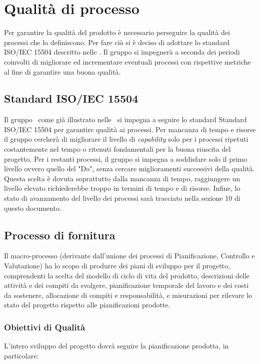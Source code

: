 \newpage

\section{Qualità di processo}
Per garantire la qualità del prodotto è necessario perseguire la qualità dei processi che lo definiscono. Per fare ciò si è deciso di adottare lo standard ISO/IEC 15504 descritto nelle \NdP. Il gruppo \gruppo{} si impegnerà a seconda dei periodi coinvolti di migliorare ed incrementare eventuali processi con rispettive metriche al fine di garantire una buona qualità.

\subsection{Standard ISO/IEC 15504}
Il gruppo \gruppo\ come già illustrato nelle \NdP\ si impegna a seguire lo standard Standard ISO/IEC 15504 per garantire qualità ai processi. Per mancanza di tempo e risorse il gruppo cercherà di migliorare il livello di \textit{capability} solo per i processi ripetuti costantemente nel tempo o ritenuti fondamentali per la buona riuscita del progetto. Per i restanti processi, il gruppo si impegna a soddisfare solo il primo livello ovvero quello del "Do", senza cercare miglioramenti successivi della qualità.
Questa scelta è dovuta soprattutto dalla mancanza di tempo, raggiungere un livello elevato richiederebbe troppo in termini di tempo e di risorse. Infine, lo stato di avanzamento del livello dei processi sarà tracciato nella sezione 10 di questo documento.

\subsection{Processo di fornitura}
Il macro-processo (derivante dall’unione dei processi di Pianificazione, Controllo e Valutazione) ha lo scopo di produrre dei piani di sviluppo per il progetto, comprendenti
la scelta del modello di ciclo di vita del prodotto, descrizioni delle attività e dei compiti
da svolgere, pianificazione temporale del lavoro e dei costi da sostenere, allocazione di compiti e
responsabilità, e misurazioni per rilevare lo stato del progetto rispetto alle pianificazioni prodotte.

\subsubsection{Obiettivi di Qualità}
L'intero sviluppo del progetto dovrà seguire la pianificazione prodotta, in particolare:

